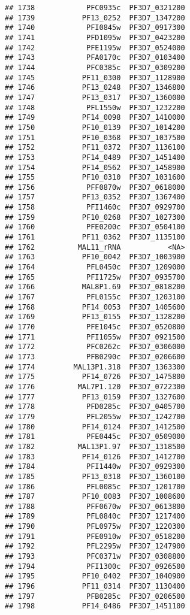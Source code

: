 \documentclass[12pt, a4paper]{article}\usepackage[]{graphicx}\usepackage[]{color}
\makeatletter
\newenvironment{kframe}{%
 \def\at@end@of@kframe{}%
 \ifinner\ifhmode%
  \def\at@end@of@kframe{\end{minipage}}%
  \begin{minipage}{\columnwidth}%
 \fi\fi%
 \def\FrameCommand##1{\hskip\@totalleftmargin \hskip-\fboxsep
 \colorbox{shadecolor}{##1}\hskip-\fboxsep
     \hskip-\linewidth \hskip-\@totalleftmargin \hskip\columnwidth}%
 \MakeFramed {\advance\hsize-\width
   \@totalleftmargin\z@ \linewidth\hsize
   \@setminipage}}%
 {\par\unskip\endMakeFramed%
 \at@end@of@kframe}
\newenvironment{knitrout}{}{} %
\makeatother
\begin{document}
\begin{knitrout}
\begin{kframe}
\begin{verbatim}
## 1738            PFC0935c  PF3D7_0321200
## 1739           PF13_0252  PF3D7_1347200
## 1740            PFI0845w  PF3D7_0917300
## 1741            PFD1095w  PF3D7_0423200
## 1742            PFE1195w  PF3D7_0524000
## 1743            PFA0170c  PF3D7_0103400
## 1744            PFC0385c  PF3D7_0309200
## 1745           PF11_0300  PF3D7_1128900
## 1746           PF13_0248  PF3D7_1346800
## 1747           PF13_0317  PF3D7_1360000
## 1748            PFL1550w  PF3D7_1232200
## 1749           PF14_0098  PF3D7_1410000
## 1750           PF10_0139  PF3D7_1014200
## 1751           PF10_0368  PF3D7_1037500
## 1752           PF11_0372  PF3D7_1136100
## 1753           PF14_0489  PF3D7_1451400
## 1754           PF14_0562  PF3D7_1458900
## 1755           PF10_0310  PF3D7_1031600
## 1756            PFF0870w  PF3D7_0618000
## 1757           PF13_0352  PF3D7_1367400
## 1758            PFI1460c  PF3D7_0929700
## 1759           PF10_0268  PF3D7_1027300
## 1760            PFE0200c  PF3D7_0504100
## 1761           PF11_0362  PF3D7_1135100
## 1762          MAL11_rRNA           <NA>
## 1763           PF10_0042  PF3D7_1003900
## 1764            PFL0450c  PF3D7_1209000
## 1765            PFI1725w  PF3D7_0935700
## 1766           MAL8P1.69  PF3D7_0818200
## 1767            PFL0155c  PF3D7_1203100
## 1768           PF14_0053  PF3D7_1405600
## 1769           PF13_0155  PF3D7_1328200
## 1770            PFE1045c  PF3D7_0520800
## 1771            PFI1055w  PF3D7_0921500
## 1772            PFC0262c  PF3D7_0306000
## 1773            PFB0290c  PF3D7_0206600
## 1774         MAL13P1.318  PF3D7_1363300
## 1775           PF14_0726  PF3D7_1475800
## 1776          MAL7P1.120  PF3D7_0722300
## 1777           PF13_0159  PF3D7_1327600
## 1778            PFD0285c  PF3D7_0405700
## 1779            PFL2055w  PF3D7_1242700
## 1780           PF14_0124  PF3D7_1412500
## 1781            PFE0445c  PF3D7_0509000
## 1782          MAL13P1.97  PF3D7_1318500
## 1783           PF14_0126  PF3D7_1412700
## 1784            PFI1440w  PF3D7_0929300
## 1785           PF13_0318  PF3D7_1360100
## 1786            PFL0085c  PF3D7_1201700
## 1787           PF10_0083  PF3D7_1008600
## 1788            PFF0670w  PF3D7_0613800
## 1789            PFL0840c  PF3D7_1217400
## 1790            PFL0975w  PF3D7_1220300
## 1791            PFE0910w  PF3D7_0518200
## 1792            PFL2295w  PF3D7_1247900
## 1793            PFC0371w  PF3D7_0308800
## 1794            PFI1300c  PF3D7_0926500
## 1795           PF10_0402  PF3D7_1040900
## 1796           PF11_0314  PF3D7_1130400
## 1797            PFB0285c  PF3D7_0206500
## 1798           PF14_0486  PF3D7_1451100

\end{verbatim}
\end{kframe}
\end{knitrout}
\end{document}
